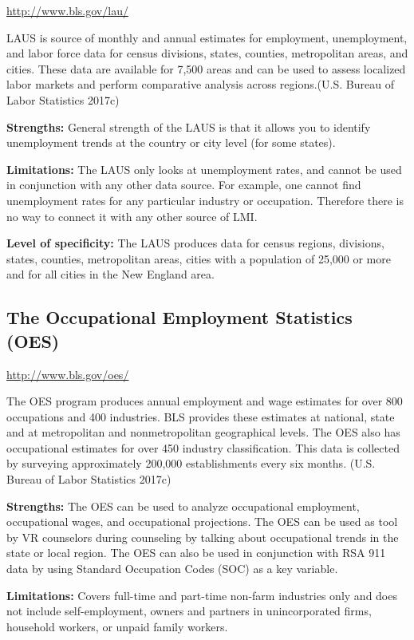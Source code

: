 \documentclass[]{book}
\theoremstyle{definition}
\theoremstyle{definition}
\theoremstyle{definition}
\theoremstyle{remark}
\begin{document}
\url{http://www.bls.gov/lau/}

LAUS is source of monthly and annual estimates for employment,
unemployment, and labor force data for census divisions, states,
counties, metropolitan areas, and cities. These data are available for
7,500 areas and can be used to assess localized labor markets and
perform comparative analysis across regions.(U.S. Bureau of Labor
Statistics 2017c)

\textbf{Strengths:} General strength of the LAUS is that it allows you
to identify unemployment trends at the country or city level (for some
states).

\textbf{Limitations:} The LAUS only looks at unemployment rates, and
cannot be used in conjunction with any other data source. For example,
one cannot find unemployment rates for any particular industry or
occupation. Therefore there is no way to connect it with any other
source of LMI.

\textbf{Level of specificity:} The LAUS produces data for census
regions, divisions, states, counties, metropolitan areas, cities with a
population of 25,000 or more and for all cities in the New England area.

\subsection{The Occupational Employment Statistics
(OES)}\label{the-occupational-employment-statistics-oes}

\url{http://www.bls.gov/oes/}

The OES program produces annual employment and wage estimates for over
800 occupations and 400 industries. BLS provides these estimates at
national, state and at metropolitan and nonmetropolitan geographical
levels. The OES also has occupational estimates for over 450 industry
classification. This data is collected by surveying approximately
200,000 establishments every six months. (U.S. Bureau of Labor
Statistics 2017c)

\textbf{Strengths:} The OES can be used to analyze occupational
employment, occupational wages, and occupational projections. The OES
can be used as tool by VR counselors during counseling by talking about
occupational trends in the state or local region. The OES can also be
used in conjunction with RSA 911 data by using Standard Occupation Codes
(SOC) as a key variable.

\textbf{Limitations:} Covers full-time and part-time non-farm industries
only and does not include self-employment, owners and partners in
unincorporated firms, household workers, or unpaid family workers.
\end{document}
